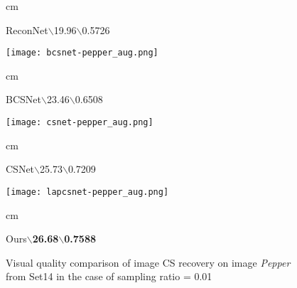 \documentclass{article}
\begin{document}
\begin{figure*}[tb]
\begin{minipage}[t]{0.12\textwidth}
\begin{scriptsize}
\centering
{} cm \begin{tiny}ReconNet$\backslash$19.96$\backslash$0.5726\end{tiny}
\end{scriptsize}
\end{minipage}
\hfill
\begin{minipage}[t]{0.12\textwidth}
\centering
\texttt{[image: bcsnet-pepper\_aug.png]}
\begin{scriptsize}
\centering
{} cm \begin{tiny}BCSNet$\backslash$23.46$\backslash$0.6508\end{tiny}
\end{scriptsize}
\end{minipage}
\hfill
\begin{minipage}[t]{0.12\textwidth}
\centering
\texttt{[image: csnet-pepper\_aug.png]}
\begin{scriptsize}
\centering
{} cm \begin{tiny}CSNet$\backslash$25.73$\backslash$0.7209\end{tiny}
\end{scriptsize}
\end{minipage}
\hfill
\begin{minipage}[t]{0.12\textwidth}
\centering
\texttt{[image: lapcsnet-pepper\_aug.png]}
\begin{scriptsize}
\centering
{} cm \begin{tiny}Ours$\backslash$\textbf{26.68}$\backslash$\textbf{0.7588}\end{tiny}
\end{scriptsize}
\label{figure2}
\end{minipage}
\vspace{-0.5em} \caption{Visual quality comparison of image CS recovery on image \emph{Pepper} from Set14 in the case of sampling ratio = 0.01}
\label{figure2}
\end{figure*}
\end{document}
